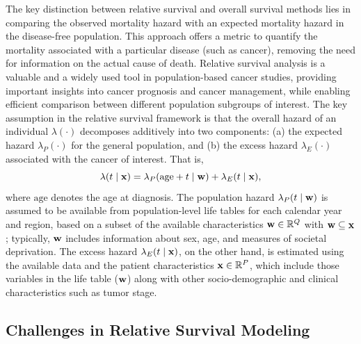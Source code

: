 \documentclass[12pt]{article}
\newcommand{\bfx}{{\bf x}}
\newcommand{\bfw}{{\bf w}}
\begin{document}
The key distinction between relative survival and overall survival methods lies in comparing the observed mortality hazard with an expected mortality hazard in the disease-free population. This approach offers a metric to quantify the mortality associated with a particular disease (such as cancer), removing the need for information on the actual cause of death. Relative survival analysis is a valuable and a widely used tool in population-based cancer studies, providing important insights into cancer prognosis and cancer management, while enabling efficient comparison between different population subgroups of interest. The key assumption in the relative survival framework is that the overall hazard of an individual $\lambda(\cdot)$ decomposes additively into two components: (a) the expected hazard $\lambda_P(\cdot)$ for the general population, and (b) the excess hazard $\lambda_E(\cdot)$ associated with the cancer of interest. That is, 
\begin{equation}
  \lambda(t \mid \bfx) = \lambda_P(\text{age} + t \mid \bfw) + \lambda_E(t \mid \bfx),
  \label{eq:exh_additive_decomp}
\end{equation}
where $\text{age}$ denotes the age at diagnosis. The population hazard $\lambda_P(t \mid \bfw)$ is assumed to be available from population-level life tables for each calendar year and region, based on a subset of the available characteristics $\bfw \in {\mathbb R}^Q$ with $\bfw \subseteq \bfx$; typically, $\bfw$ includes information about sex, age, and measures of societal deprivation. The excess hazard $\lambda_E(t \mid \bfx)$, on the other hand, is estimated using the available data and the patient characteristics $\bfx\in {\mathbb R}^P$, which include those variables in the life table ($\bfw$) along with other socio-demographic and clinical characteristics such as tumor stage. 
 
\subsection{Challenges in Relative Survival Modeling}
\end{document}
